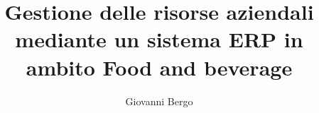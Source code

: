 \title{Gestione delle risorse aziendali mediante un sistema ERP in ambito Food and beverage}

\author{Giovanni Bergo}



